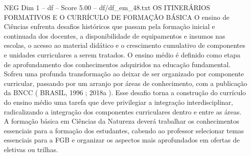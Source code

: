 \begin{textsample}{NEG Dim 1 – df – Score 5.00 – df/df\_em\_48.txt}  \label{ex:f1_neg_166}
OS ITINERÁRIOS FORMATIVOS E O CURRÍCULO DE FORMAÇÃO BÁSICA O ensino de Ciências enfrenta desafios históricos que passam pela formação inicial e continuada dos docentes, a disponibilidade de equipamentos e insumos nas escolas, o acesso ao material didático e o crescimento cumulativo de componentes e unidades curriculares a serem tratados.
O ensino médio é definido como etapa de aprofundamento dos conhecimentos adquiridos na educação fundamental.
Sofreu uma profunda transformação ao deixar de ser organizado por componente curricular, passando por um arranjo por áreas de conhecimento, com a publicação da BNCC ( BRASIL, 1996 ; 2018a ).
Esse desafio torna a construção do currículo do ensino médio uma tarefa que deve privilegiar a integração interdisciplinar, radicalizando a integração dos componentes curriculares dentro e entre as áreas.
A formação básica em Ciências da Natureza deverá trabalhar os conhecimentos essenciais para a formação dos estudantes, cabendo ao professor selecionar temas essenciais para a FGB e organizar os aspectos mais aprofundados em ofertas de eletivas ou trilhas.

\end{textsample}
